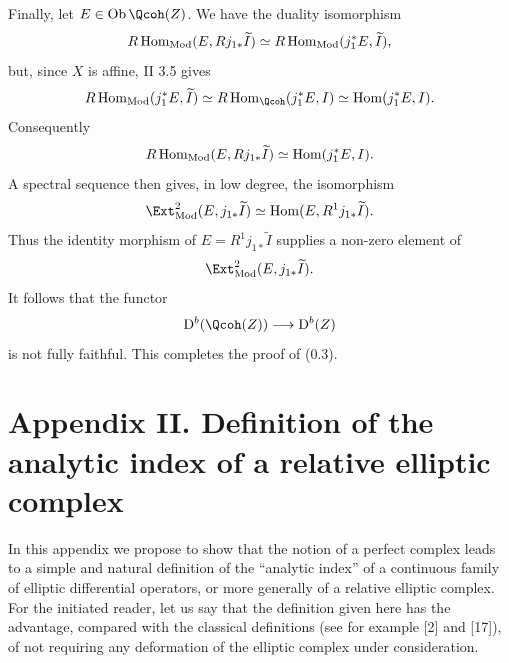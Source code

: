 Finally, let $E\in\Ob\Qcoh(Z)$. We have the duality isomorphism
\[
 R\Hom_{\Mod}(E,Rj_{1*}\widetilde I)
 \simeq R\Hom_{\Mod}(j_1^*E,\widetilde I),
\]
but, since $X$ is affine, II 3.5 gives
\[
 R\Hom_{\Mod}(j_1^*E,\widetilde I)
 \simeq R\Hom_{\Qcoh}(j_1^*E,I)
 \simeq \Hom(j_1^*E,I).
\]
Consequently
\[
 R\Hom_{\Mod}(E,Rj_{1*}\widetilde I)
 \simeq \Hom(j_1^*E,I).
\]
A spectral sequence then gives, in low degree, the isomorphism
\[
 \Ext^2_{\Mod}(E,j_{1*}\widetilde I)
 \simeq \Hom(E,R^1j_{1*}\widetilde I).
\]
Thus the identity morphism of $E=R^1j_{1*}\widetilde I$ supplies a non-zero element of
\[
 \Ext^2_{\Mod}(E,j_{1*}\widetilde I).
\]
It follows that the functor
\[
 \mathrm D^b(\Qcoh(Z))\longrightarrow \mathrm D^b(Z)
\]
is not fully faithful. This completes the proof of (0.3).




\providecommand{\Diff}{\operatorname{Diff}}
\providecommand{\Hom}{\operatorname{Hom}}
\providecommand{\im}{\operatorname{Im}}
\providecommand{\ind}{\operatorname{ind}}
\providecommand{\Cone}{\operatorname{Cone}}
\providecommand{\Loclib}{\operatorname{Loclib}}
\providecommand{\ob}{\operatorname{ob}}
\providecommand{\Parf}{\operatorname{Parf}}
\providecommand{\Mod}{\operatorname{Mod}}
\providecommand{\Ob}{\operatorname{Ob}}
\providecommand{\Coker}{\operatorname{Coker}}
\providecommand{\Ker}{\operatorname{Ker}}
\providecommand{\cH}{\mathcal H}
\providecommand{\cO}{\mathcal O}
\providecommand{\cP}{\mathcal P}
\providecommand{\cE}{\mathcal E}
\providecommand{\cF}{\mathcal F}
\providecommand{\cG}{\mathcal G}
\providecommand{\cD}{\mathcal D}
\providecommand{\cT}{\mathcal T}
\providecommand{\cL}{\mathcal L}
\providecommand{\RHom}{\mathrm R\!\operatorname{Hom}}
\providecommand{\RGamma}{\mathrm R\Gamma}
\providecommand{\dlim}{\operatorname*{lim}}
\providecommand{\plim}{\operatorname*{lim}}


\newpage
\section*{Appendix II. Definition of the analytic index of a relative elliptic complex}

In this appendix we propose to show that the notion of a perfect complex leads to a simple and natural definition of the ``analytic index'' of a continuous family of elliptic differential operators, or more generally of a relative elliptic complex. For the initiated reader, let us say that the definition given here has the advantage, compared with the classical definitions (see for example [2] and [17]), of not requiring any deformation of the elliptic complex under consideration.

